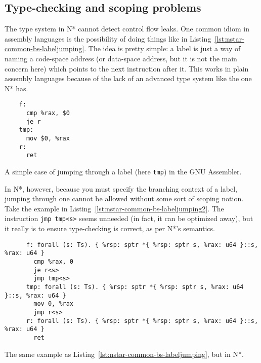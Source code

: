 \subsection{Type-checking and scoping problems}\label{subsec:nstar-common-bs-tcscopes}

The type system in N* cannot detect control flow leaks.
One common idiom in assembly languages is the possibility of doing things like in Listing~\ref{lst:nstar-common-bs-labeljumping}.
The idea is pretty simple: a label is just a way of naming a code-space address (or data-space address, but it is not the main concern here) which points to the next instruction after it.
This works in plain assembly languages because of the lack of an advanced type system like the one N* has.

\begin{listing}[htb]
  \centering
  \begin{minipage}{0.90\textwidth}
    \begin{verbatim}
    f:
      cmp %rax, $0
      je r
    tmp:
      mov $0, %rax
    r:
      ret
    \end{verbatim}
  \end{minipage}
  \caption{A simple case of jumping through a label (here \texttt{tmp}) in the GNU Assembler.}
  \label{lst:nstar-common-bs-labeljumping}
\end{listing}

In N*, however, because you must specify the branching context of a label, jumping through one cannot be allowed without some sort of scoping notion.
Take the example in Listing~\ref{lst:nstar-common-bs-labeljumping2}.
The instruction \texttt{jmp tmp<s>} seems unneeded (in fact, it can be optimized away), but it really is to ensure type-checking is correct, as per N*'s semantics.

\begin{listing}[htb]
  \centering
  \begin{minipage}{0.90\textwidth}
    \begin{verbatim}
      f: forall (s: Ts). { %rsp: sptr *{ %rsp: sptr s, %rax: u64 }::s, %rax: u64 }
        cmp %rax, 0
        je r<s>
        jmp tmp<s>
      tmp: forall (s: Ts). { %rsp: sptr *{ %rsp: sptr s, %rax: u64 }::s, %rax: u64 }
        mov 0, %rax
        jmp r<s>
      r: forall (s: Ts). { %rsp: sptr *{ %rsp: sptr s, %rax: u64 }::s, %rax: u64 }
        ret
    \end{verbatim}
  \end{minipage}
  \caption{The same example as Listing~\ref{lst:nstar-common-bs-labeljumping}, but in N*.}
  \label{lst:nstar-common-bs-labeljumping2}
\end{listing}

